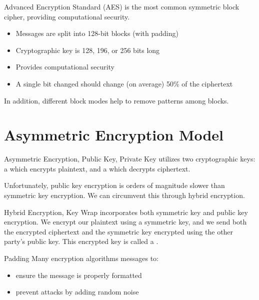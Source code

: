 \documentclass[12pt]{report}
\begin{document}
\begin{dfnbox}{Advanced Encryption Standard (AES)}{}
     is the most common symmetric block cipher, providing computational security.
    \begin{itemize}[noitemsep]
        \item Messages are split into 128-bit blocks (with padding)
        \item Cryptographic key is 128, 196, or 256 bits long
        \item Provides computational security
        \item A single bit changed should change (on average) 50\% of the ciphertext
    \end{itemize}
    In addition, different block modes help to remove patterns among blocks.
\end{dfnbox}

\section{Asymmetric Encryption Model}

\begin{dfnbox}{Asymmetric Encryption, Public Key, Private Key}{}
     utilizes two cryptographic keys: a  which encrypts plaintext, and a  which decrypts ciphertext.
\end{dfnbox}

Unfortunately, public key encryption is orders of magnitude slower than symmetric key encryption. We can circumvent this through hybrid encryption.

\begin{dfnbox}{Hybrid Encryption, Key Wrap}{}
     incorporates both symmetric key and public key encryption. We encrypt our plaintext using a symmetric key, and we send both the encrypted ciphertext and the symmetric key encrypted using the other party's public key. This encrypted key is called a .
\end{dfnbox}

\begin{dfnbox}{Padding}{}
    Many encryption algorithms  messages to:
    \begin{itemize}[noitemsep]
        \item ensure the message is properly formatted
        \item prevent attacks by adding random noise
    \end{itemize}
\end{dfnbox}
\end{document}
